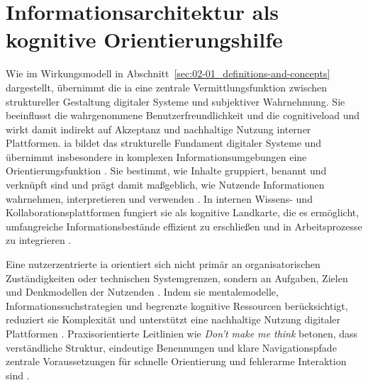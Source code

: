 \section{Informationsarchitektur als kognitive Orientierungshilfe}
\label{sec:02-03_information-architecture}

Wie im Wirkungsmodell in Abschnitt~\ref{sec:02-01_definitions-and-concepts} dargestellt, übernimmt die \Gls{ia} eine zentrale Vermittlungsfunktion zwischen struktureller Gestaltung digitaler Systeme und subjektiver Wahrnehmung. Sie beeinflusst die wahrgenommene Benutzerfreundlichkeit und die \gls{cognitiveload} und wirkt damit indirekt auf Akzeptanz und nachhaltige Nutzung interner Plattformen. \Gls{ia} bildet das strukturelle Fundament digitaler Systeme und übernimmt insbesondere in komplexen Informationsumgebungen eine Orientierungsfunktion \cite{303:Rosenfeld2015}. Sie bestimmt, wie Inhalte gruppiert, benannt und verknüpft sind und prägt damit maßgeblich, wie Nutzende Informationen wahrnehmen, interpretieren und verwenden \cite{303:Rosenfeld2015,403:Westerman2014}. In internen Wissens- und Kollaborationsplattformen fungiert sie als kognitive Landkarte, die es ermöglicht, umfangreiche Informationsbestände effizient zu erschließen und in Arbeitsprozesse zu integrieren \cite{303:Rosenfeld2015,300:FraunhoferIESE2018}.

Eine nutzerzentrierte \Gls{ia} orientiert sich nicht primär an organisatorischen Zuständigkeiten oder technischen Systemgrenzen, sondern an Aufgaben, Zielen und Denkmodellen der Nutzenden \cite{303:Rosenfeld2015,905:Norman1983}. Indem sie \gls{mentalemodelle}, Informationssuchstrategien und begrenzte kognitive Ressourcen berücksichtigt, reduziert sie Komplexität und unterstützt eine nachhaltige Nutzung digitaler Plattformen \cite{105:Sweller1988,414:Johnson2021}. Praxisorientierte Leitlinien wie \textit{Don’t make me think} betonen, dass verständliche Struktur, eindeutige Benennungen und klare Navigationspfade zentrale Voraussetzungen für schnelle Orientierung und fehlerarme Interaktion sind \cite{415:Krug2014,414:Johnson2021}.




